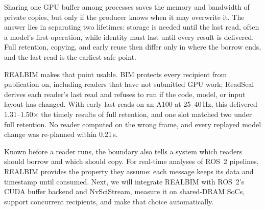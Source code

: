 \documentclass[conference]{IEEEtran}
\newcommand{\sys}{REALBIM}
\newcommand{\Hz}{\,Hz}
\begin{document}
Sharing one GPU buffer among processes saves the memory and bandwidth of private copies, but only if the producer knows when it may overwrite it. The answer lies in separating two lifetimes: storage is needed until the last read, often a model's first operation, while identity must last until every result is delivered. Full retention, copying, and early reuse then differ only in where the borrow ends, and the last read is the earliest safe point.

\sys{} makes that point usable. BIM protects every recipient from publication on, including readers that have not submitted GPU work; ReadSeal derives each reader's last read and refuses to run if the code, model, or input layout has changed. With early last reads on an A100 at 25--40\Hz, this delivered 1.31--1.50$\times$ the timely results of full retention, and one slot matched two under full retention. No reader computed on the wrong frame, and every replayed model change was re-planned within 0.21\,s.

Known before a reader runs, the boundary also tells a system which readers should borrow and which should copy. For real-time analyses of ROS~2 pipelines, \sys{} provides the property they assume: each message keeps its data and timestamp until consumed. Next, we will integrate \sys{} with ROS~2's CUDA buffer backend and NvSciStream, measure it on shared-DRAM SoCs, support concurrent recipients, and make that choice automatically.



\end{document}
